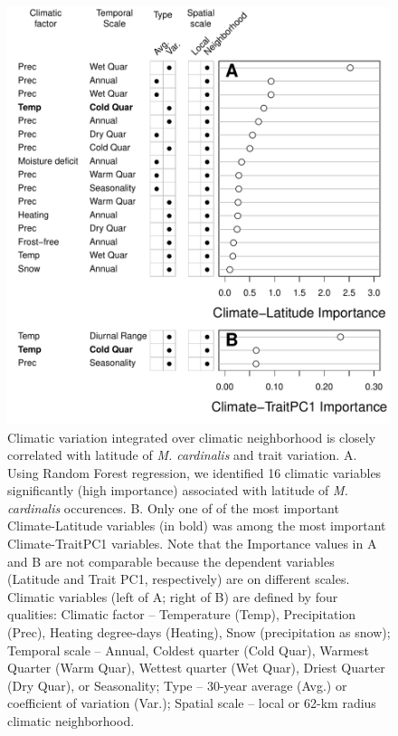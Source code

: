 \documentclass[11pt, oneside]{article}
\begin{document}

\begin{figure}[h!]
	\centerline{\includegraphics[width=1\textwidth]{Figures/Figure_ClimVarImp.pdf}}
	\fontsize{10}{12}
	\selectfont
	\caption[Climatic variation integrated over climatic neighborhood is closely correlated with latitude of \textit{M. cardinalis} and trait variation]{Climatic variation integrated over climatic neighborhood is closely correlated with latitude of \textit{M. cardinalis} and trait variation.  A. Using Random Forest regression, we identified 16 climatic variables significantly (high importance) associated with latitude of \textit{M. cardinalis} occurences. B. Only one of of the most important Climate-Latitude variables (in bold) was among the most important Climate-TraitPC1 variables. Note that the Importance values in A and B are not comparable because the dependent variables (Latitude and Trait PC1, respectively) are on different scales. Climatic variables (left of A; right of B) are defined by four qualities: Climatic factor -- Temperature (Temp), Precipitation (Prec), Heating degree-days (Heating), Snow (precipitation as snow); Temporal scale -- Annual, Coldest quarter (Cold Quar), Warmest Quarter (Warm Quar), Wettest quarter (Wet Quar), Driest Quarter (Dry Quar), or Seasonality; Type -- 30-year average (Avg.) or coefficient of variation (Var.); Spatial scale -- local or 62-km radius climatic neighborhood.}
	\label{fig:Fig_ClimVarImp}
\end{figure}
\end{document}
